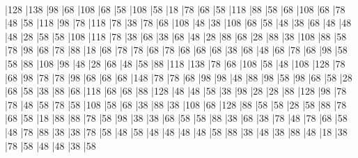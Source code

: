 \begin{slide*}
~\\
\begin{barenv}
\setlength{\unitlength}{0.6pt}
\bar{12}{8}
\bar{13}{8}
\bar{9}{8}
\bar{6}{8}
\bar{10}{8}
\bar{6}{8}
\bar{5}{8}
\bar{10}{8}
\bar{5}{8}
\bar{1}{8}
\bar{7}{8}
\bar{6}{8}
\bar{5}{8}
\bar{11}{8}
\bar{8}{8}
\bar{5}{8}
\bar{6}{8}
\bar{10}{8}
\bar{6}{8}
\bar{7}{8}
\bar{4}{8}
\bar{5}{8}
\bar{11}{8}
\bar{9}{8}
\bar{7}{8}
\bar{11}{8}
\bar{7}{8}
\bar{3}{8}
\bar{7}{8}
\bar{6}{8}
\bar{10}{8}
\bar{4}{8}
\bar{3}{8}
\bar{10}{8}
\bar{6}{8}
\bar{5}{8}
\bar{4}{8}
\bar{3}{8}
\bar{6}{8}
\bar{4}{8}
\bar{4}{8}
\bar{4}{8}
\bar{2}{8}
\bar{5}{8}
\bar{5}{8}
\bar{10}{8}
\bar{11}{8}
\bar{7}{8}
\bar{3}{8}
\bar{6}{8}
\bar{3}{8}
\bar{6}{8}
\bar{4}{8}
\bar{2}{8}
\bar{8}{8}
\bar{6}{8}
\bar{2}{8}
\bar{8}{8}
\bar{3}{8}
\bar{10}{8}
\bar{8}{8}
\bar{5}{8}
\bar{7}{8}
\bar{9}{8}
\bar{6}{8}
\bar{7}{8}
\bar{8}{8}
\bar{1}{8}
\bar{6}{8}
\bar{7}{8}
\bar{7}{8}
\bar{6}{8}
\bar{7}{8}
\bar{6}{8}
\bar{6}{8}
\bar{6}{8}
\bar{3}{8}
\bar{6}{8}
\bar{4}{8}
\bar{6}{8}
\bar{7}{8}
\bar{6}{8}
\bar{9}{8}
\bar{5}{8}
\bar{5}{8}
\bar{8}{8}
\bar{10}{8}
\bar{9}{8}
\bar{4}{8}
\bar{2}{8}
\bar{6}{8}
\bar{4}{8}
\bar{5}{8}
\bar{8}{8}
\bar{11}{8}
\bar{13}{8}
\bar{7}{8}
\bar{6}{8}
\bar{10}{8}
\bar{5}{8}
\bar{4}{8}
\bar{10}{8}
\bar{12}{8}
\bar{7}{8}
\bar{6}{8}
\bar{9}{8}
\bar{7}{8}
\bar{7}{8}
\bar{9}{8}
\bar{6}{8}
\bar{6}{8}
\bar{6}{8}
\bar{14}{8}
\bar{7}{8}
\bar{7}{8}
\bar{6}{8}
\bar{9}{8}
\bar{9}{8}
\bar{4}{8}
\bar{8}{8}
\bar{9}{8}
\bar{5}{8}
\bar{9}{8}
\bar{6}{8}
\bar{5}{8}
\bar{2}{8}
\bar{6}{8}
\bar{5}{8}
\bar{3}{8}
\bar{8}{8}
\bar{6}{8}
\bar{11}{8}
\bar{6}{8}
\bar{6}{8}
\bar{8}{8}
\bar{12}{8}
\bar{4}{8}
\bar{4}{8}
\bar{5}{8}
\bar{3}{8}
\bar{9}{8}
\bar{2}{8}
\bar{2}{8}
\bar{8}{8}
\bar{12}{8}
\bar{9}{8}
\bar{7}{8}
\bar{7}{8}
\bar{4}{8}
\bar{5}{8}
\bar{7}{8}
\bar{5}{8}
\bar{10}{8}
\bar{5}{8}
\bar{6}{8}
\bar{3}{8}
\bar{8}{8}
\bar{3}{8}
\bar{10}{8}
\bar{6}{8}
\bar{12}{8}
\bar{8}{8}
\bar{5}{8}
\bar{5}{8}
\bar{2}{8}
\bar{5}{8}
\bar{8}{8}
\bar{7}{8}
\bar{6}{8}
\bar{5}{8}
\bar{1}{8}
\bar{8}{8}
\bar{8}{8}
\bar{7}{8}
\bar{5}{8}
\bar{9}{8}
\bar{3}{8}
\bar{3}{8}
\bar{6}{8}
\bar{5}{8}
\bar{5}{8}
\bar{8}{8}
\bar{3}{8}
\bar{6}{8}
\bar{3}{8}
\bar{7}{8}
\bar{4}{8}
\bar{7}{8}
\bar{6}{8}
\bar{5}{8}
\bar{4}{8}
\bar{7}{8}
\bar{8}{8}
\bar{3}{8}
\bar{3}{8}
\bar{7}{8}
\bar{5}{8}
\bar{4}{8}
\bar{5}{8}
\bar{4}{8}
\bar{4}{8}
\bar{4}{8}
\bar{4}{8}
\bar{5}{8}
\bar{8}{8}
\bar{3}{8}
\bar{4}{8}
\bar{3}{8}
\bar{8}{8}
\bar{4}{8}
\bar{1}{8}
\bar{3}{8}
\bar{7}{8}
\bar{5}{8}
\bar{4}{8}
\bar{4}{8}
\bar{3}{8}
\bar{5}{8}

\end{barenv}
\end{slide*}
